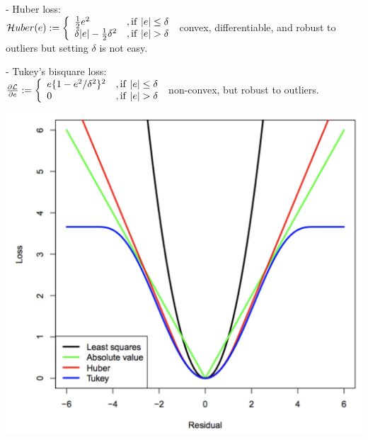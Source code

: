 - Huber loss: \\
${\cal H}u b e r(e):=\left\{\begin{array}{l l}{{\frac{1}{2}e^{2}}}&{{,\mathrm{if}\ |e|\leq\delta}}\\ {{\delta|e|-\frac{1}{2}\delta^{2}}}&{{,\mathrm{if}\ |e|>\delta}}\end{array}\right.$ convex, differentiable, and robust to outliers but setting $\delta$ is not easy.

- Tukey’s bisquare loss: \\
$\frac{\partial\mathcal{L}}{\partial e}:=\left\{\begin{array}{l l}{{e\{1-e^{2}/\delta^{2}\}^{2}}}&{{,\mathrm{if}\,\,|e|\leq\delta}}\\ {{0}}&{{,\mathrm{if} \ |e| > \delta}}\end{array}\right.$ non-convex, but robust to outliers.

\includegraphics[width=\linewidth]{loss_functions.png}